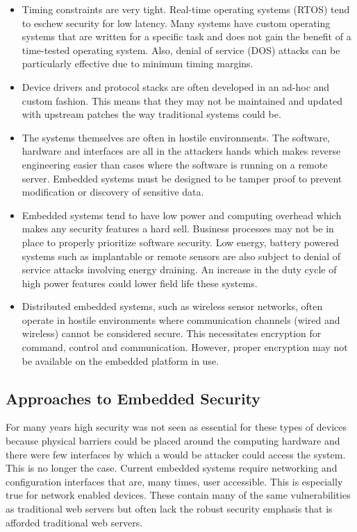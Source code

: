 \documentclass[final,conference,10pt]{IEEEtran}
\begin{document}
\begin{itemize}
\item 
Timing constraints are very tight.  Real-time operating systems (RTOS) tend to eschew security for low latency.  Many systems have custom operating systems that are written for a specific task and does not gain the benefit of a time-tested operating system.  Also, denial of service (DOS) attacks can be particularly effective due to minimum timing margins. \cite{Catal2011}
\item
Device drivers and protocol stacks are often developed in an ad-hoc and custom fashion.  This means that they may not be maintained and updated with upstream patches the way traditional systems could be.
\item 
The systems themselves are often in hostile environments. The software, hardware and interfaces are all in the attackers hands which makes reverse engineering easier than cases where the software is running on a remote server.  Embedded systems must be designed to be tamper proof to prevent modification or discovery of sensitive data.
\item 
Embedded systems tend to have low power and computing overhead which makes any security features a hard sell. Business processes may not be in place to properly prioritize software security.
Low energy, battery powered systems such as implantable or remote sensors are also subject to denial of service attacks involving energy draining.  An increase in the duty cycle of high power features could lower field life these systems. \cite{Vasserman2013}
\item 
Distributed embedded systems, such as wireless sensor networks, often operate in hostile environments where communication channels (wired and wireless) cannot be considered secure.  This necessitates encryption for command, control and communication. However, proper encryption may not be available on the embedded platform in use. \cite{Bojinov2010}
\end{itemize}

\subsection{Approaches to Embedded Security}

For many years high security was not seen as essential for these types of devices because physical barriers could be placed around the computing hardware and there were few interfaces by which a would be attacker could access the system.  This is no longer the case.  Current embedded systems require networking and configuration interfaces that are, many times, user accessible.  This is especially true for network enabled devices.  These contain many of the same vulnerabilities as traditional web servers but often lack the robust security emphasis that is afforded traditional web servers. \cite{Kumar2012}
\end{document}
